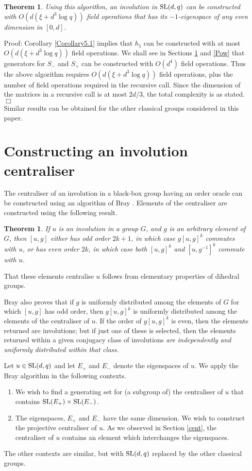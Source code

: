 \documentclass[12pt]{article}
\newtheorem{theorem}[definition]{Theorem}
\newenvironment{proof}{\normalsize {\sc Proof}:}{{\hfill $\Box$ \\}}
\def\SL{{\rm SL}}
\begin{document}
\begin{theorem}\label{Corollary5.2}  
Using this algorithm, an involution in $\SL(d,q)$
can be constructed with $O(d(\xi + d^3 \log q))$ field operations that has its
$-1$-eigenspace of any even dimension in $[0,d]$.
\end{theorem}
\begin{proof}
Corollary \ref{Corollary5.1} implies that $h_1$ can be constructed with at most 
$O(d(\xi + d^3 \log q))$ field operations. We shall see in 
Sections \ref{Bray} and 
\ref{Pow} that  generators for $S_-$ and $S_+$ can be constructed
with $O(d^4)$ field operations. Thus the above algorithm requires
$O(d(\xi + d^3 \log q))$ field operations, plus the number of field operations
required in the recursive call. Since the dimension of the matrices
in a recursive call is at most $2d/3$, the total
complexity is as stated.
\end{proof}
Similar results can be obtained for the other classical groups
considered in this paper.

\section{Constructing an involution centraliser}
\label{Bray}

The centraliser of an involution in a black-box group having an order
oracle can be constructed using an algorithm of Bray \cite{Bray}. 
Elements of the centraliser are constructed using the following result.
\begin{theorem}
\label{thm:bray}
If $u$ is an involution in a group $G$, and $g$ is an arbitrary element of $G$,
then $[u,g]$ either has odd order $2k+1$, in which case
$g[u,g]^k$ commutes with $u$, or has even order $2k$, in which case
both $[u,g]^k$ and $[u,g^{-1}]^k$ commute with $u$.
\end{theorem}
That these elements centralise $u$ follows from elementary
properties of dihedral groups. 

Bray \cite{Bray} also proves that if $g$ is uniformly
distributed among the elements of $G$ for which $[u,g]$
has odd order, then $g[u,g]^k$ is uniformly distributed among the
elements of the centraliser of $u$. If the order of $g[u,g]^k$ is even, 
then the elements returned are involutions; but if just
one of these is selected, then the elements returned
within a given conjugacy class of involutions {\it are independently
and uniformly distributed within that class}. 

Let $u \in \SL(d, q)$ and let $E_+$ and $E_-$ denote the 
eigenspaces of $u$.
We apply the Bray algorithm in the following contexts. 
\begin{enumerate}
\item 
We wish to find a generating set for (a subgroup of) the centraliser 
of $u$ that contains $\SL(E_+)\times \SL(E_-)$. 
\item 
The eigenspaces, $E_+$ and $E_-$ have the same dimension. 
We wish to construct the projective centraliser of $u$.
As we observed in Section \ref{cent}, the centraliser 
of $u$ contains an element which interchanges the eigenspaces.
\end{enumerate}
The other contexts are similar, but with $\SL(d,q)$ 
replaced by the other classical groups. 
\end{document}
